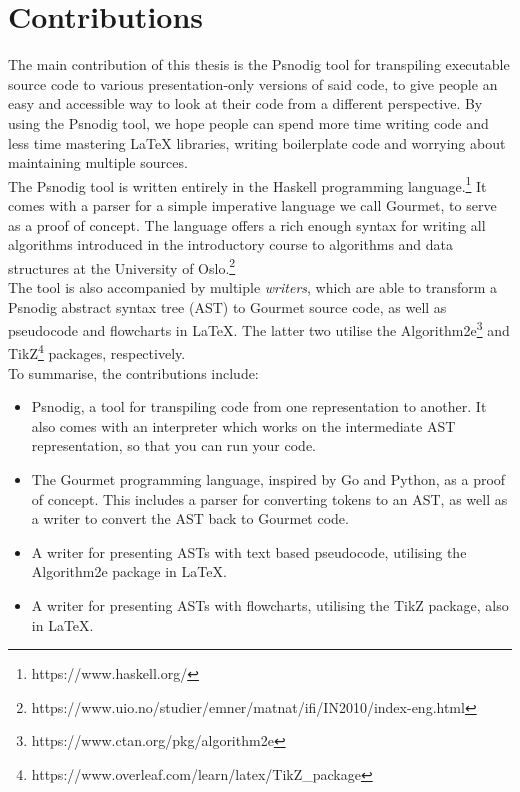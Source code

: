 \section{Contributions}

The main contribution of this thesis is the Psnodig tool for transpiling executable source code to various presentation-only versions of said code, to give people an easy and accessible way to look at their code from a different perspective. By using the Psnodig tool, we hope people can spend more time writing code and less time mastering LaTeX libraries, writing boilerplate code and worrying about maintaining multiple sources. \hfill \\

The Psnodig tool is written entirely in the Haskell programming language.\footnote{https://www.haskell.org/} It comes with a parser for a simple imperative language we call Gourmet, to serve as a proof of concept. The language offers a rich enough syntax for writing all algorithms introduced in the introductory course to algorithms and data structures at the University of Oslo.\footnote{https://www.uio.no/studier/emner/matnat/ifi/IN2010/index-eng.html} \hfill \\

The tool is also accompanied by multiple \textit{writers}, which are able to transform a Psnodig abstract syntax tree (AST) to Gourmet source code, as well as pseudocode and flowcharts in LaTeX. The latter two utilise the Algorithm2e\footnote{https://www.ctan.org/pkg/algorithm2e} and TikZ\footnote{https://www.overleaf.com/learn/latex/TikZ\_package} packages, respectively. \hfill \\


To summarise, the contributions include:
\begin{itemize}
    \item Psnodig, a tool for transpiling code from one representation to another. It also comes with an interpreter which works on the intermediate AST representation, so that you can run your code.
    \item The Gourmet programming language, inspired by Go and Python, as a proof of concept. This includes a parser for converting tokens to an AST, as well as a writer to convert the AST back to Gourmet code.
    \item A writer for presenting ASTs with text based pseudocode, utilising the Algorithm2e package in LaTeX.
    \item A writer for presenting ASTs with flowcharts, utilising the TikZ package, also in LaTeX.
\end{itemize}


